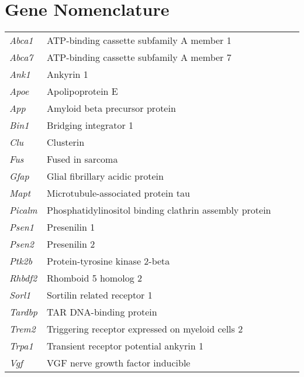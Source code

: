 \chapter*{Gene Nomenclature}

\setlength{\tabcolsep}{12pt}
\begin{tabular}{l p{1.5\linewidth}}
\textit{Abca1}& ATP-binding cassette subfamily A member 1 \\
\textit{Abca7}&  ATP-binding cassette subfamily A member 7 \\
\textit{Ank1} & Ankyrin 1\\
\textit{Apoe}&  Apolipoprotein E \\
\textit{App}& Amyloid beta precursor protein \\
\textit{Bin1}&Bridging integrator 1 \\
\textit{Clu}&Clusterin \\
\textit{Fus}&Fused in sarcoma \\
\textit{Gfap}&Glial fibrillary acidic protein\\
\textit{Mapt}&Microtubule-associated protein tau \\
\textit{Picalm}&Phosphatidylinositol binding clathrin assembly protein \\
\textit{Psen1}&Presenilin 1 \\
\textit{Psen2}&Presenilin 2 \\
\textit{Ptk2b}&Protein-tyrosine kinase 2-beta \\
\textit{Rhbdf2}&Rhomboid 5 homolog 2 \\
\textit{Sorl1}&Sortilin related receptor 1 \\
\textit{Tardbp}& TAR DNA-binding protein \\
\textit{Trem2}&Triggering receptor expressed on myeloid cells 2 \\
\textit{Trpa1}&Transient receptor potential ankyrin 1 \\
\textit{Vgf}&VGF nerve growth factor inducible \\
\end{tabular}

